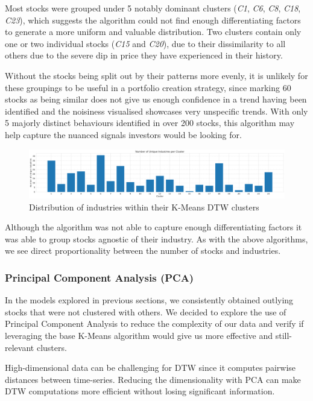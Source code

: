\documentclass[11pt]{article}
\begin{document}
Most stocks were grouped under 5 notably dominant clusters (\textit{C1}, \textit{C6}, \textit{C8}, \textit{C18}, \textit{C23}), which suggests the algorithm could not find enough differentiating factors to generate a more uniform and valuable distribution. Two clusters contain only one or two individual stocks (\textit{C15} and \textit{C20}), due to their dissimilarity to all others due to the severe dip in price they have experienced in their history.

Without the stocks being split out by their patterns more evenly, it is unlikely for these groupings to be useful in a portfolio creation strategy, since marking 60 stocks as being similar does not give us enough confidence in a trend having been identified and the noisiness visualised showcases very unspecific trends. With only 5 majorly distinct behaviours identified in over 200 stocks, this algorithm may help capture the nuanced signals investors would be looking for.

\begin{figure}[H]
\centering
\includegraphics[width=12cm]{img/dtw-kmeans-industries.png} 
\caption{Distribution of industries within their K-Means DTW clusters}
\label{fig:dtw_kmeans_industries}
\end{figure}

Although the algorithm was not able to capture enough differentiating factors it was able to group stocks agnostic of their industry. As with the above algorithms, we see direct proportionality between the number of stocks and industries.

\subsubsection{Principal Component Analysis (PCA)}

In the models explored in previous sections, we consistently obtained outlying stocks that were not clustered with others. We decided to explore the use of Principal Component Analysis to reduce the complexity of our data and verify if leveraging the base K-Means algorithm would give us more effective and still-relevant clusters.

 High-dimensional data can be challenging for DTW since it computes pairwise distances between time-series. Reducing the dimensionality with PCA can make DTW computations more efficient without losing significant information.
\end{document}
